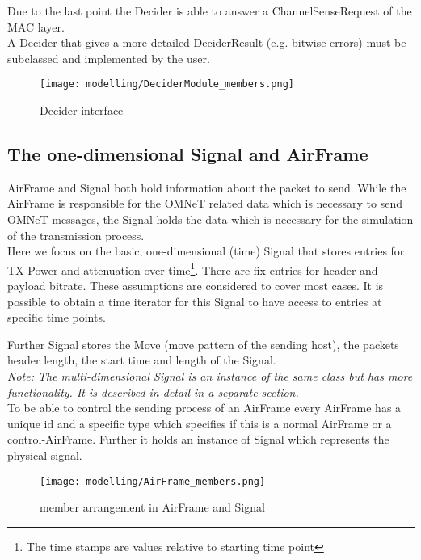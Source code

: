 Due to the last point the Decider is able to answer a ChannelSenseRequest of the
MAC layer.\\

A Decider that gives a more detailed DeciderResult (e.g. bitwise
errors) must be subclassed and implemented by the user.

\begin{figure}[H]
 \centering
 \texttt{[image: modelling/DeciderModule\_members.png]}
 \caption{Decider interface}
 \label{fig: Decider interface}
\end{figure}

\newpage

\subsection{The one-dimensional Signal and AirFrame}
\label{AirFrame and Signal}

AirFrame and Signal both hold information about the packet to send. While the
AirFrame is responsible for the OMNeT related data which is necessary to send
OMNeT messages, the Signal holds the data which is necessary for the simulation
of the transmission process.\\

Here we focus on the basic, one-dimensional (time) Signal that stores entries
for TX Power and attenuation over time\footnote{The time stamps are values
relative to starting time point}. There are fix entries for header and
payload bitrate. These assumptions are considered to cover most cases.
It is possible to obtain a time iterator for this Signal to have access to
entries at specific time points.

Further Signal stores the Move (move pattern of the sending host), the packets
header length, the start time and length of the Signal.\\

\emph{Note: The multi-dimensional Signal is an instance of the same class but
has more functionality. It is described in detail in a separate section.}\\

To be able to control the sending process of an AirFrame
every AirFrame has a unique id and a specific type which specifies if this is a
normal AirFrame or a control-AirFrame. Further it holds an instance of Signal
which represents the physical signal.


\begin{figure}[H]
 \centering
 \texttt{[image: modelling/AirFrame\_members.png]}
 \caption{member arrangement in AirFrame and Signal}
 \label{fig:memberAirFrame}
\end{figure}
\newpage

